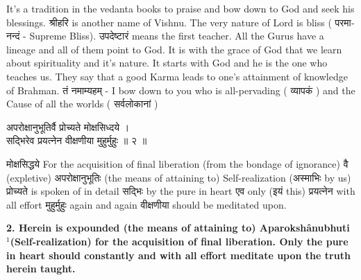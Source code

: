 \documentclass{article}
\begin{document}
\begin{oframed}
It's a tradition in the vedanta books to praise and bow down to God and
seek his blessings.
\texthindi{श्रीहरि}
is another name of Vishnu. The very nature of Lord is bliss (
\texthindi{परमानन्दं}
- Supreme Bliss).
\texthindi{उपदेष्टारं}
 means the first teacher. All the Gurus have a lineage and all of them point to
God. It is with the grace of God that we learn about spirituality and it's
nature. It starts with God and he is the one who teaches us. They say that a
good Karma leads to one's attainment of knowledge of Brahman.
\texthindi{तं नमाम्यहम्}
- I bow down to you who is all-pervading (
\texthindi{व्यापकं}
) 
 and the Cause of all the worlds (
\texthindi{सर्वलोकानां}
)
\end{oframed}
 
\bigskip

\begin{large}
\begin{center}
    \begin{hindi}
	अपरोक्षानुभूतिर्वै प्रोच्यते मोक्षसिध्दये ।\\
	सद्भिरेव प्रयत्नेन वीक्षणीया मुहुर्मुहुः ॥ २ ॥
    \end{hindi}
\end{center}
\end{large}

\texthindi{मोक्षसिद्धये}
For the acquisition of final liberation (from the bondage of ignorance)
\texthindi{वै}
(expletive)
\texthindi{अपरोक्षानुभूतिः}
(the means of attaining to) Self-realization
(\texthindi{अस्माभिः}
by us)
\texthindi{प्रोच्यते}
is spoken of in detail
\texthindi{सद्भिः}
by the pure in heart
\texthindi{एव}
only
(\texthindi{इयं}
this)
\texthindi{प्रयत्नेन}
with all effort
\texthindi{मुहुर्मुहुः}
again and again
\texthindi{वीक्षणीया}
should be meditated upon.

\bigskip

\textbf{ 2. Herein is expounded (the means of attaining to) Aparokshânubhuti
$^1$(Self-realization) for the acquisition of final liberation.  Only the pure
in heart should constantly and with all effort meditate upon the truth herein
taught.  }
\end{document}
